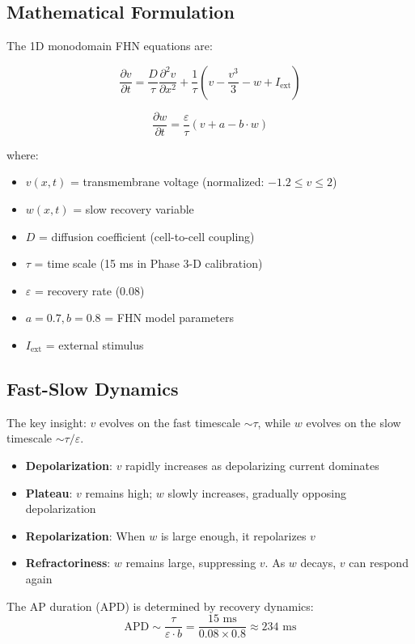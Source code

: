\documentclass[12pt,a4paper]{article}
\begin{document}
\subsection*{Mathematical Formulation}

The 1D monodomain FHN equations are:

$$\frac{\partial v}{\partial t} = \frac{D}{\tau} \frac{\partial^2 v}{\partial x^2} + \frac{1}{\tau} \left( v - \frac{v^3}{3} - w + I_{\text{ext}} \right)$$

$$\frac{\partial w}{\partial t} = \frac{\varepsilon}{\tau} \left( v + a - b \cdot w \right)$$

where:
\begin{itemize}
\item $v(x,t)$ = transmembrane voltage (normalized: $-1.2 \le v \le 2$)
\item $w(x,t)$ = slow recovery variable
\item $D$ = diffusion coefficient (cell-to-cell coupling)
\item $\tau$ = time scale (15 ms in Phase 3-D calibration)
\item $\varepsilon$ = recovery rate (0.08)
\item $a = 0.7, b = 0.8$ = FHN model parameters
\item $I_{\text{ext}}$ = external stimulus
\end{itemize}

\subsection*{Fast-Slow Dynamics}

The key insight: $v$ evolves on the fast timescale $\sim \tau$, while $w$ evolves on the slow timescale $\sim \tau/\varepsilon$.

\begin{itemize}
\item \textbf{Depolarization}: $v$ rapidly increases as depolarizing current dominates
\item \textbf{Plateau}: $v$ remains high; $w$ slowly increases, gradually opposing depolarization
\item \textbf{Repolarization}: When $w$ is large enough, it repolarizes $v$
\item \textbf{Refractoriness}: $w$ remains large, suppressing $v$. As $w$ decays, $v$ can respond again
\end{itemize}

The AP duration (APD) is determined by recovery dynamics:
$$\text{APD} \sim \frac{\tau}{\varepsilon \cdot b} = \frac{15 \text{ ms}}{0.08 \times 0.8} \approx 234 \text{ ms}$$
\end{document}
